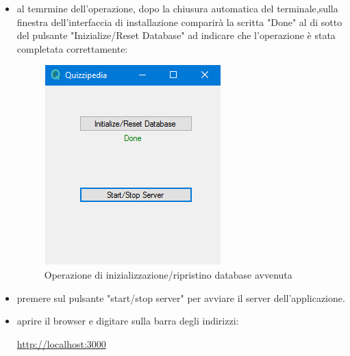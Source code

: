 \documentclass[12pt,a4paper]{article}
\begin{document}
\begin{itemize}
			\item al temrmine dell'operazione, dopo la chiusura automatica del terminale,sulla finestra dell'interfaccia di installazione comparirà la scritta "Done" al di sotto del pulsante "Inizialize/Reset Database" ad indicare che l'operazione è stata completata correttamente:
			\begin{figure}[H]	
				\centering
				\includegraphics[width=0.4\linewidth]{../img/manualeInstallazione/win_installer03.png}
				\caption{Operazione di inizializzazione/ripristino database avvenuta}
				\label{Operazione di inizializzazione/ripristino database avvenuta}
			\end{figure}
			\item premere sul pulsante "start/stop server" per avviare il server dell'applicazione.
			\item aprire il browser e digitare sulla barra degli indirizzi:
				\begin{center}
					\url{http://localhost:3000}
				\end{center}
		
				
		\end{itemize}	
		
\end{document}
